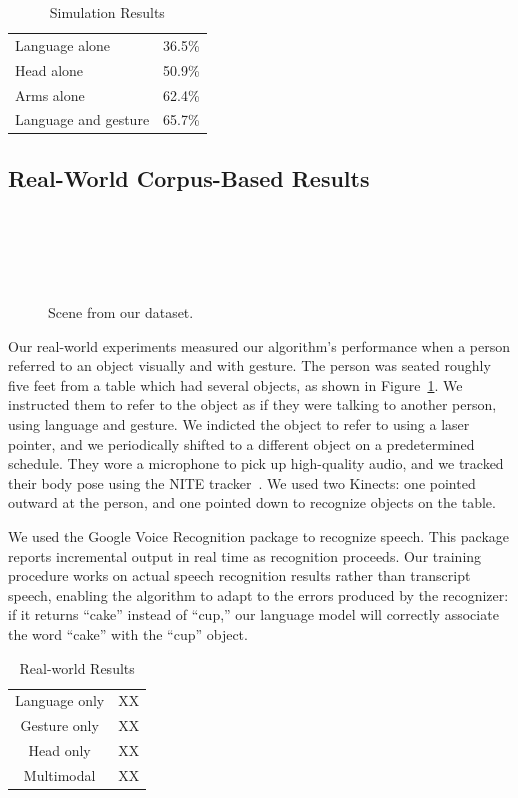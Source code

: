 \documentclass[letterpaper, 10 pt, conference]{ieeeconf}
\begin{document}
\begin{table}
\caption{Simulation Results\label{table:sim_results}}
\begin{tabular}{lr}
Language alone &  36.5\%\\
Head alone & 50.9\%\\
Arms alone & 62.4\%\\
Language and gesture &  65.7\%
\end{tabular}

\end{table}

\subsection{Real-World Corpus-Based Results}

\begin{figure}
\parbox{1\linewidth}{~\\~\\~\\~\\}
\caption{Scene from our dataset.\label{fig:corpus_scene}}
\end{figure}

Our real-world experiments measured our algorithm's performance when a
person referred to an object visually and with gesture.  The person
was seated roughly five feet from a table which had several objects,
as shown in Figure~\ref{fig:corpus_scene}.  We instructed them to
refer to the object as if they were talking to another person, using
language and gesture.  We indicted the object to refer to using a
laser pointer, and we periodically shifted to a different object on a
predetermined schedule.  They wore a microphone to pick up
high-quality audio, and we tracked their body pose using the NITE
tracker~\citep{openni}.  We used two Kinects: one pointed outward at the
person, and one pointed down to recognize objects on the table.

We used the Google Voice Recognition package to recognize speech.
This package reports incremental output in real time as recognition
proceeds.  Our training procedure works on actual speech recognition
results rather than transcript speech, enabling the algorithm to adapt
to the errors produced by the recognizer: if it returns ``cake''
instead of ``cup,'' our language model will correctly associate the
word ``cake'' with the ``cup'' object.

\begin{table}
\caption{Real-world Results}
\begin{tabular}{cc}
Language only &  XX\\
Gesture only  &  XX\\
Head only     &  XX\\
Multimodal    &  XX\\
\end{tabular}
\end{table}
\end{document}
